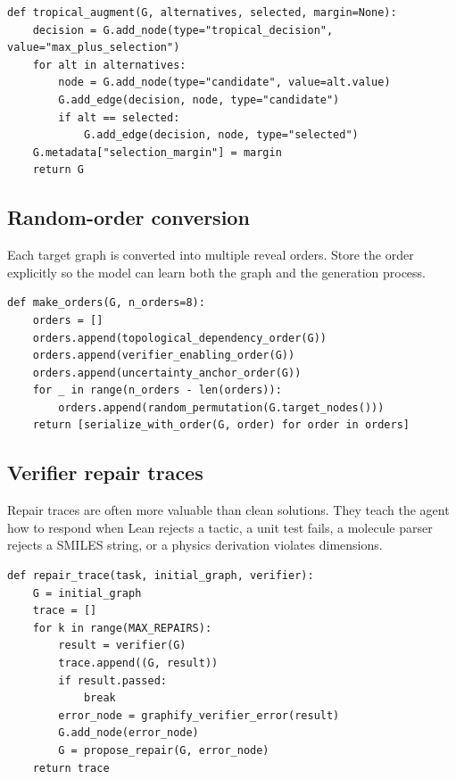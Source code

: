 \documentclass[11pt]{article}
\newcommand{\1}{\mathbf{1}}
\begin{document}
\begin{lstlisting}[caption={Tropical decision augmentation.}]
def tropical_augment(G, alternatives, selected, margin=None):
    decision = G.add_node(type="tropical_decision", value="max_plus_selection")
    for alt in alternatives:
        node = G.add_node(type="candidate", value=alt.value)
        G.add_edge(decision, node, type="candidate")
        if alt == selected:
            G.add_edge(decision, node, type="selected")
    G.metadata["selection_margin"] = margin
    return G
\end{lstlisting}

\subsection{Random-order conversion}

Each target graph is converted into multiple reveal orders. Store the order explicitly so the model can learn both the graph and the generation process.

\begin{lstlisting}[caption={Random-order target construction.}]
def make_orders(G, n_orders=8):
    orders = []
    orders.append(topological_dependency_order(G))
    orders.append(verifier_enabling_order(G))
    orders.append(uncertainty_anchor_order(G))
    for _ in range(n_orders - len(orders)):
        orders.append(random_permutation(G.target_nodes()))
    return [serialize_with_order(G, order) for order in orders]
\end{lstlisting}

\subsection{Verifier repair traces}

Repair traces are often more valuable than clean solutions. They teach the agent how to respond when Lean rejects a tactic, a unit test fails, a molecule parser rejects a SMILES string, or a physics derivation violates dimensions.

\begin{lstlisting}[caption={Verifier repair trace construction.}]
def repair_trace(task, initial_graph, verifier):
    G = initial_graph
    trace = []
    for k in range(MAX_REPAIRS):
        result = verifier(G)
        trace.append((G, result))
        if result.passed:
            break
        error_node = graphify_verifier_error(result)
        G.add_node(error_node)
        G = propose_repair(G, error_node)
    return trace
\end{lstlisting}
\end{document}
